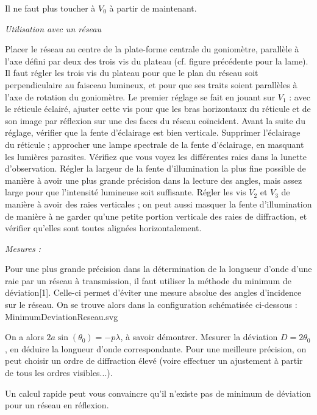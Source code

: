 \documentclass{article}%
\begin{document}
Il ne faut plus toucher à $V_0$ à partir de maintenant.

\textit{Utilisation avec un réseau}

Placer le réseau au centre de la plate-forme centrale du goniomètre, parallèle à l’axe défini par deux des trois vis du plateau (cf. figure précédente pour la lame). Il faut régler les trois vis du plateau pour que le plan du réseau soit perpendiculaire au faisceau lumineux, et pour que ses traits soient parallèles à l’axe de rotation du goniomètre. Le premier réglage se fait en jouant sur $V_1$ : avec le réticule éclairé, ajuster cette vis pour que les bras horizontaux du réticule et de son image par réflexion sur une des faces du réseau coïncident. Avant la suite du réglage, vérifier que la fente d'éclairage est bien verticale. Supprimer l’éclairage du réticule ; approcher une lampe spectrale de la fente d’éclairage, en masquant les lumières parasites. Vérifiez que vous voyez les différentes raies dans la lunette d’observation. Régler la largeur de la fente d’illumination la plus fine possible de manière à avoir une plus grande précision dans la lecture des angles, mais assez large pour que l’intensité lumineuse soit suffisante. Régler les vis $V_2$ et $V_3$ de manière à avoir des raies verticales ; on peut aussi masquer la fente d’illumination de manière à ne garder qu’une petite portion verticale des raies de diffraction, et vérifier qu’elles sont toutes alignées horizontalement.

\textit{Mesures :}

Pour une plus grande précision dans la détermination de la longueur d'onde d'une raie par un réseau à transmission, il faut utiliser la méthode du minimum de déviation[1]. Celle-ci permet d'éviter une mesure absolue des angles d'incidence sur le réseau. On se trouve alors dans la configuration schématisée ci-dessous :
MinimumDeviationReseau.svg

On a alors $2a \sin(\theta_{0})=-p\lambda$, à savoir démontrer. Mesurer la déviation $ D=2\theta_{0}$, en déduire la longueur d’onde correspondante. Pour une meilleure précision, on peut choisir un ordre de diffraction élevé (voire effectuer un ajustement à partir de tous les ordres visibles...).

Un calcul rapide peut vous convaincre qu'il n'existe pas de minimum de déviation pour un réseau en réflexion.

\end{document}
